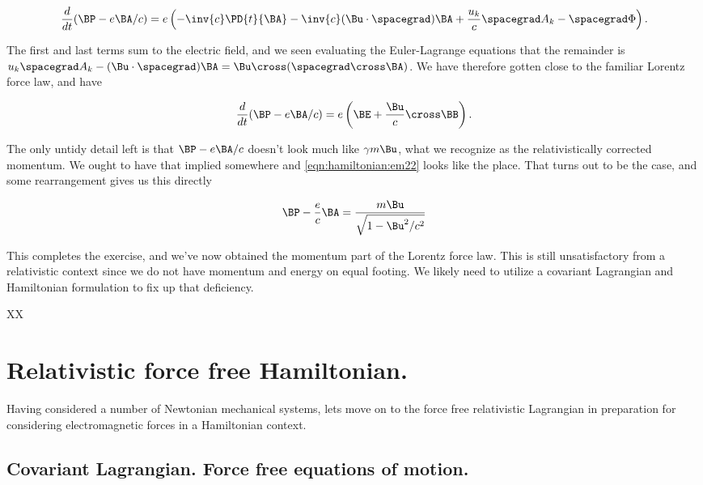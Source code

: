 \begin{align}\label{eqn:hamiltonian:em23c}
\frac{d}{dt}(\BP - e\BA/c) = e \left( -\inv{c}\PD{t}{\BA} - \inv{c} (\Bu \cdot \spacegrad) \BA + \frac{u_k}{c} \spacegrad A_k - \spacegrad \Phi \right).
\end{align}

The first and last terms sum to the electric field, and we seen evaluating the Euler-Lagrange equations that the remainder is $u_k \spacegrad A_k - (\Bu \cdot \spacegrad) \BA = \Bu \cross (\spacegrad \cross \BA)$.  We have therefore gotten close to the familiar Lorentz force law, and have

\begin{align}\label{eqn:hamiltonian:em24}
\frac{d}{dt}(\BP - e\BA/c) = e \left( \BE + \frac{\Bu}{c} \cross \BB \right).
\end{align}

The only untidy detail left is that $\BP - e \BA/c$ doesn't look much like $\gamma m \Bu$, what we recognize as the relativistically corrected momentum.  We ought to have that implied somewhere and \ref{eqn:hamiltonian:em22} looks like the place.  That turns out to be the case, and some rearrangement gives us this directly

\begin{align}\label{eqn:hamiltonian:em25}
\BP - \frac{e}{c}\BA = \frac{m \Bu}{\sqrt{1 - \Bu^2/c^2}}
\end{align}

This completes the exercise, and we've now obtained the momentum part of the Lorentz force law.  This is still unsatisfactory from a relativistic context since we do not have momentum and energy on equal footing.  We likely need to utilize a covariant Lagrangian and Hamiltonian formulation to fix up that deficiency.

XX
\section{Relativistic force free Hamiltonian.}

Having considered a number of Newtonian mechanical systems, lets move on to the force free relativistic Lagrangian in preparation for considering electromagnetic forces in a Hamiltonian context.

\subsection{Covariant Lagrangian.  Force free equations of motion.}

